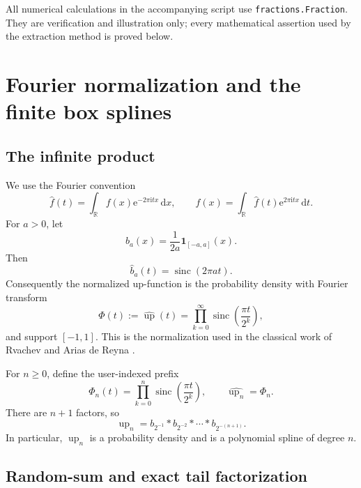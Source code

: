 \documentclass[11pt]{article}
\newcommand{\R}{\mathbb{R}}
\newcommand{\dd}{\,\mathrm{d}}
\newcommand{\upf}{\operatorname{up}}
\newcommand{\sinc}{\operatorname{sinc}}
\newcommand{\e}{\mathrm{e}}
\newcommand{\ii}{\mathrm{i}}
\newcommand{\ind}{\mathbf{1}}
\begin{document}
All numerical calculations in the accompanying script use
\texttt{fractions.Fraction}.  They are verification and illustration only;
every mathematical assertion used by the extraction method is proved below.

\section{Fourier normalization and the finite box splines}

\subsection{The infinite product}

We use the Fourier convention
\begin{equation}\label{eq:fourier}
 \widehat f(t)=\int_{\R}f(x)\e^{-2\pi\ii tx}\dd x,
 \qquad
 f(x)=\int_{\R}\widehat f(t)\e^{2\pi\ii tx}\dd t.
\end{equation}
For \(a>0\), let
\[
 b_a(x)=\frac{1}{2a}\ind_{[-a,a]}(x).
\]
Then
\[
 \widehat b_a(t)=\sinc(2\pi at).
\]
Consequently the normalized up-function is the probability density with
Fourier transform
\begin{equation}\label{eq:Phi}
 \Phi(t):=\widehat{\upf}(t)
 =\prod_{k=0}^{\infty}\sinc\!\left(\frac{\pi t}{2^k}\right),
\end{equation}
and support \([-1,1]\).  This is the normalization used in the classical work
of Rvachev and Arias de Reyna \cite{Rvachev1990,Arias1982}.

For \(n\ge0\), define the user-indexed prefix
\begin{equation}\label{eq:prefix-user}
 \Phi_n(t)=\prod_{k=0}^{n}\sinc\!\left(\frac{\pi t}{2^k}\right),
 \qquad \widehat{\upf_n}=\Phi_n.
\end{equation}
There are \(n+1\) factors, so
\begin{equation}\label{eq:prefix-convolution}
 \upf_n=b_{2^{-1}}*b_{2^{-2}}*\cdots*b_{2^{-(n+1)}}.
\end{equation}
In particular, \(\upf_n\) is a probability density and is a polynomial spline
of degree \(n\).

\subsection{Random-sum and exact tail factorization}
\end{document}
